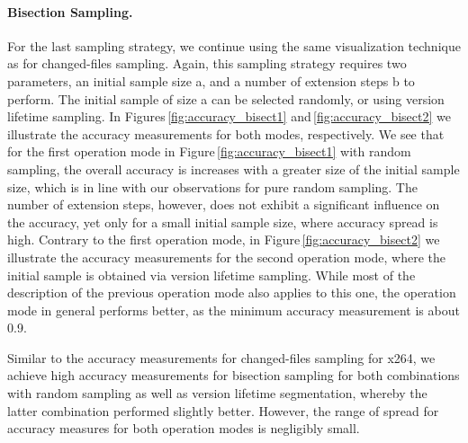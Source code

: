 \paragraph{Bisection Sampling.} 
For the last sampling strategy, we continue using the same visualization
technique as for changed-files sampling. Again, this sampling strategy requires
two parameters, an initial sample size a, and a number of extension steps b to
perform. The initial sample of size a can be selected randomly, or using
version lifetime sampling. In Figures\,\ref{fig:accuracy_bisect1}
and\,\ref{fig:accuracy_bisect2} we illustrate the accuracy measurements for both modes, respectively. We see that for the first operation
mode in Figure\,\ref{fig:accuracy_bisect1} with random sampling, the overall
accuracy is increases with a greater size of the initial sample size, which is in line with our
observations for pure random sampling. The number of extension steps, however,
does not exhibit a significant influence on the accuracy, yet only for a small
initial sample size, where accuracy spread is high. Contrary to the first
operation mode, in Figure\,\ref{fig:accuracy_bisect2} we illustrate the accuracy
measurements for the second operation mode, where the initial sample is obtained via version
lifetime sampling. While most of the description of the previous operation mode
also applies to this one, the operation mode in general performs better, as the
minimum accuracy measurement is about 0.9.

Similar to the accuracy measurements for changed-files sampling for x264, we
achieve high accuracy measurements for bisection sampling for both combinations
with random sampling as well as version lifetime segmentation, whereby the
latter combination performed slightly better. However, the range of spread for
accuracy measures for both operation modes is negligibly small.

